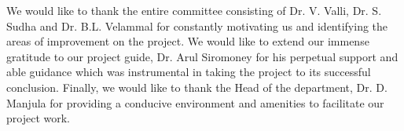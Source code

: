 We would like to thank the entire committee consisting of Dr. V. Valli, Dr. S. Sudha and Dr. B.L. Velammal for constantly motivating us and identifying the areas of improvement on the project. We would like to extend our immense gratitude to our project guide, Dr. Arul Siromoney for his perpetual support and able guidance which was instrumental in taking the project to its successful conclusion. Finally, we would like to thank the Head of the department, Dr. D. Manjula for providing a conducive environment and amenities to facilitate our project work.